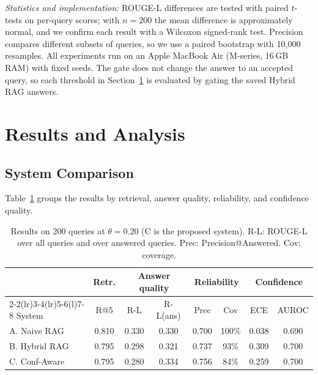 \documentclass[conference]{IEEEtran}
\begin{document}
\noindent\textit{Statistics and implementation:} ROUGE-L differences are
tested with paired $t$-tests on per-query scores; with $n=200$ the mean
difference is approximately normal, and we confirm each result with a
Wilcoxon signed-rank test. Precision compares different subsets of
queries, so we use a paired bootstrap with 10{,}000 resamples. All
experiments run on an Apple MacBook Air (M-series, 16\,GB RAM) with fixed
seeds. The gate does not change the answer to an accepted query, so
each threshold in Section~\ref{sec:results} is evaluated by gating the
saved Hybrid RAG answers.

\section{Results and Analysis}
\label{sec:results}
\subsection{System Comparison}
Table~\ref{tab:main} groups the results by retrieval, answer quality,
reliability, and confidence quality.

\begin{table}[t]
\caption{Results on 200 queries at $\theta=0.20$ (C is the proposed
system). R-L: ROUGE-L over all
queries and over answered queries. Prec: Precision@Answered. Cov: coverage.}
\label{tab:main}
\centering
\footnotesize
\setlength{\tabcolsep}{2.4pt}
\renewcommand{\arraystretch}{1.15}
\begin{tabular}{@{}l c cc cc cc@{}}
\toprule
 & Retr. & \multicolumn{2}{c}{Answer quality} & \multicolumn{2}{c}{Reliability} & \multicolumn{2}{c}{Confidence} \\
\cmidrule(lr){2-2}\cmidrule(lr){3-4}\cmidrule(lr){5-6}\cmidrule(l){7-8}
System & R@5 & R-L & R-L(ans) & Prec & Cov & ECE & AUROC \\
\midrule
A. Naive RAG         & 0.810 & 0.330 & 0.330 & 0.700 & 100\% & 0.038 & 0.690 \\
B. Hybrid RAG        & 0.795 & 0.298 & 0.321 & 0.737 & 93\%  & 0.309 & 0.700 \\
C. Conf-Aware        & 0.795 & 0.280 & 0.334 & 0.756 & 84\%  & 0.259 & 0.700 \\
\bottomrule
\end{tabular}
\end{table}
\end{document}

